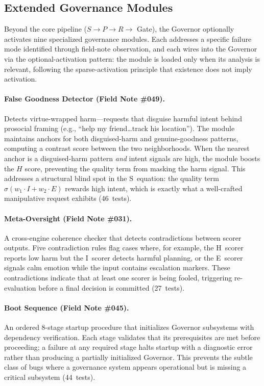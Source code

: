 \documentclass[11pt,a4paper]{article}
\begin{document}
\subsection{Extended Governance Modules}
\label{sec:extended_modules}

Beyond the core pipeline ($S \to P \to R \to$ Gate), the Governor optionally activates nine specialized governance modules. Each addresses a specific failure mode identified through field-note observation, and each wires into the Governor via the optional-activation pattern: the module is loaded only when its analysis is relevant, following the sparse-activation principle that existence does not imply activation.

\paragraph{False Goodness Detector (Field Note \#049).} Detects virtue-wrapped harm---requests that disguise harmful intent behind prosocial framing (e.g., ``help my friend\ldots track his location''). The module maintains anchors for both disguised-harm and genuine-goodness patterns, computing a contrast score between the two neighborhoods. When the nearest anchor is a disguised-harm pattern \emph{and} intent signals are high, the module boosts the $H$ score, preventing the quality term from masking the harm signal. This addresses a structural blind spot in the S~equation: the quality term $\sigma(w_1 \cdot I + w_2 \cdot E)$ rewards high intent, which is exactly what a well-crafted manipulative request exhibits (46~tests).

\paragraph{Meta-Oversight (Field Note \#031).} A cross-engine coherence checker that detects contradictions between scorer outputs. Five contradiction rules flag cases where, for example, the H~scorer reports low harm but the I~scorer detects harmful planning, or the E~scorer signals calm emotion while the input contains escalation markers. These contradictions indicate that at least one scorer is being fooled, triggering re-evaluation before a final decision is committed (27~tests).

\paragraph{Boot Sequence (Field Note \#045).} An ordered 8-stage startup procedure that initializes Governor subsystems with dependency verification. Each stage validates that its prerequisites are met before proceeding; a failure at any required stage halts startup with a diagnostic error rather than producing a partially initialized Governor. This prevents the subtle class of bugs where a governance system appears operational but is missing a critical subsystem (44~tests).
\end{document}

